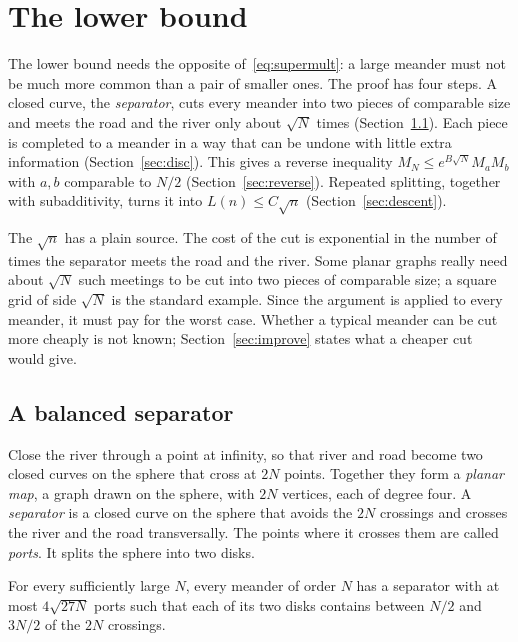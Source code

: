 \section{The lower bound}\label{sec:lower}

The lower bound needs the opposite of~\eqref{eq:supermult}: a large meander must not be much more
common than a pair of smaller ones. The proof has four steps. A closed curve, the
\emph{separator}, cuts every meander into two pieces of comparable size and meets the road and the
river only about $\sqrt N$ times (Section~\ref{sec:separator}). Each piece is completed to a meander
in a way that can be undone with little extra information (Section~\ref{sec:disc}). This gives a
reverse inequality $M_N\le e^{B\sqrt N}M_aM_b$ with $a,b$ comparable to $N/2$
(Section~\ref{sec:reverse}). Repeated splitting, together with subadditivity, turns it into
$L(n)\le C\sqrt n$ (Section~\ref{sec:descent}).

The $\sqrt n$ has a plain source. The cost of the cut is exponential in the number of times the
separator meets the road and the river. Some planar graphs really need about $\sqrt N$ such meetings
to be cut into two pieces of comparable size; a square grid of side $\sqrt N$ is the standard
example. Since the argument is applied to every meander, it must pay for the worst case. Whether a
typical meander can be cut more cheaply is not known; Section~\ref{sec:improve} states what a cheaper
cut would give.

\subsection{A balanced separator}\label{sec:separator}

Close the river through a point at infinity, so that river and road become two closed curves on the
sphere that cross at $2N$ points. Together they form a \emph{planar map}, a graph drawn on the
sphere, with $2N$ vertices, each of degree four. A \emph{separator} is a closed curve on the sphere
that avoids the $2N$ crossings and crosses the river and the road transversally. The points where it
crosses them are called \emph{ports}. It splits the sphere into two disks.

\begin{proposition}\label{prop:noose}
For every sufficiently large $N$, every meander of order $N$ has a separator with at most
$4\sqrt{27N}$ ports such that each of its two disks contains between $N/2$ and $3N/2$ of the $2N$
crossings.
\end{proposition}

